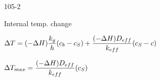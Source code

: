 \begin{mitframe}{105-2}
\begin{listone}
	\item Internal temp. change
    \item $\iipf\Temp=(-\iipf\enthalpy)\dfrac{\thermcond_{\grav}}{\heattranscoeff}(c_b-c_{\entropy})+\dfrac{(-\iipf\enthalpy)\elecdisplace_{eff}}{\thermcond_{eff}}(c_{\entropy}-c)$
    \item $\iipf\Temp_{max}=\dfrac{(-\iipf\enthalpy)\elecdisplace_{eff}}{\thermcond_{eff}}(c_{\entropy})$
\end{listone}    
\end{mitframe}